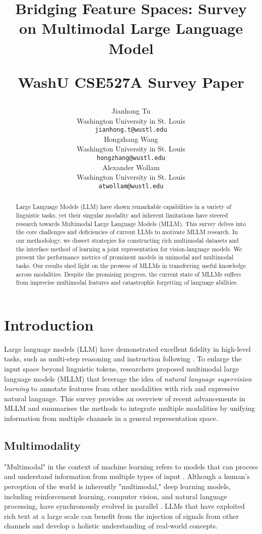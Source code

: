 \documentclass[11pt]{article}
\title{Bridging Feature Spaces: Survey on Multimodal Large Language Model



 \vspace{1em}
  \small{\normalfont WashU CSE527A Survey Paper} }
\author{Jianhong Tu \\
  Washington University in St. Louis \\
  \texttt{jianhong.t@wustl.edu} \\\And
  Hongzhang Wang \\
  Washington University in St. Louis \\
  \texttt{hongzhang@wustl.edu} \\\AND
  Alexander Wollam \\
  Washington University in St. Louis \\
  \texttt{atwollam@wustl.edu} \\}
\begin{document}
\maketitle

\begin{abstract}
Large Language Models (LLM) have shown remarkable capabilities in a variety of linguistic tasks, yet their singular modality and inherent limitations have steered research towards Multimodal Large Language Models (MLLM). This survey delves into the core challenges and deficiencies of current LLMs to motivate MLLM research. In our methodology, we dissect strategies for constructing rich multimodal datasets and the interface method of learning a joint representation for vision-language models. We present the performance metrics of prominent models in unimodal and multimodal tasks. Our results shed light on the prowess of MLLMs in transferring useful knowledge across modalities. Despite the promising progress, the current state of MLLMs suffers from imprecise multimodal features and catastrophic forgetting of language abilities.

\end{abstract}

\section{Introduction}
Large language models (LLM) have demonstrated excellent fidelity in high-level tasks, such as multi-step reasoning \citep{DBLP:journals/corr/abs-2112-11446} and instruction following \citep{DBLP:conf/nips/Ouyang0JAWMZASR22}. To enlarge the input space beyond linguistic tokens, researchers proposed multimodal large language models (MLLM) that leverage the idea of \textit{natural language supervision learning} \citep{DBLP:conf/icml/RadfordKHRGASAM21} to annotate features from other modalities with rich and expressive natural language. This survey provides an overview of recent advancements in MLLM and summarises the methods to integrate multiple modalities by unifying information from multiple channels in a general representation space.

\subsection{Multimodality}
"Multimodal" in the context of machine learning refers to models that can process and understand information from multiple types of input \citep{kress2009multimodality}. Although a human's perception of the world is inherently "multimodal," deep learning models, including reinforcement learning, computer vision, and natural language processing, have synchronously evolved in parallel \citep{DBLP:journals/corr/abs-2306-13549}. LLMs that have exploited rich text at a large scale can benefit from the injection of signals from other channels and develop a holistic understanding of real-world concepts.
\end{document}
